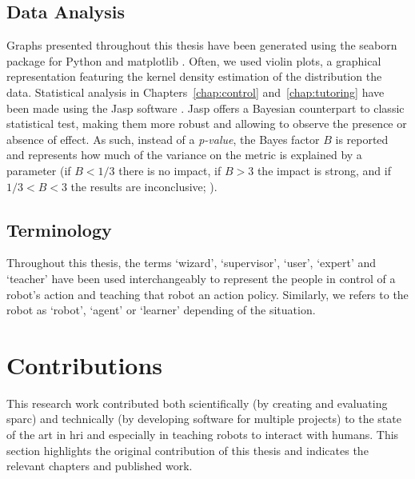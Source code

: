 \subsection{Data Analysis}
Graphs presented throughout this thesis have been generated using the seaborn package for Python and matplotlib \citep{waskom2017seaborn}. Often, we used violin plots, a graphical representation featuring the kernel density estimation of the distribution  the data. Statistical analysis in Chapters~\ref{chap:control} and~\ref{chap:tutoring} have been made using the Jasp software \citep{jasp2018}. Jasp offers a Bayesian counterpart to classic statistical test, making them more robust and allowing to observe the presence or absence of effect. As such, instead of a \emph{p-value}, the Bayes factor $B$ is reported and represents how much of the variance on the metric is explained by a parameter (if $B < 1/3$ there is no impact, if $B > 3$ the impact is strong, and if $1/3<B<3$ the results are inconclusive; \citealt{jeffreys1998theory,dienes2011bayesian}). 

\subsection{Terminology}

Throughout this thesis, the terms `wizard', `supervisor', `user', `expert' and `teacher' have been used interchangeably to represent the people in control of a robot's action and teaching that robot an action policy. Similarly, we refers to the robot as `robot', `agent' or `learner' depending of the situation.
%
%

\section{Contributions}\label{sec:intro_contr}

This research work contributed both scientifically (by creating and evaluating \gls{sparc}) and technically (by developing software for multiple projects) to the state of the art in \gls{hri} and especially in teaching robots to interact with humans. This section highlights the original contribution of this thesis and indicates the relevant chapters and published work.

